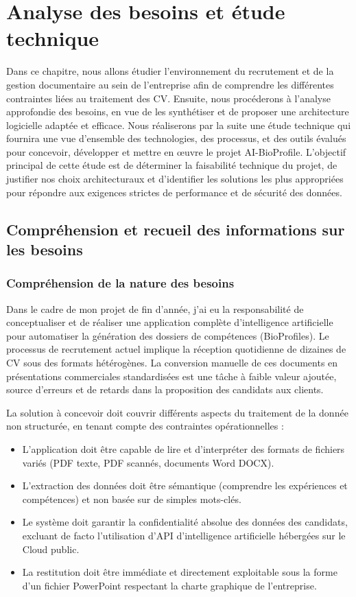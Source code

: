 
\chapter{Analyse des besoins et étude technique}

Dans ce chapitre, nous allons étudier l'environnement du recrutement et de la gestion documentaire au sein de l'entreprise afin de comprendre les différentes contraintes liées au traitement des CV. Ensuite, nous procéderons à l'analyse approfondie des besoins, en vue de les synthétiser et de proposer une architecture logicielle adaptée et efficace. Nous réaliserons par la suite une étude technique qui fournira une vue d'ensemble des technologies, des processus, et des outils évalués pour concevoir, développer et mettre en œuvre le projet AI-BioProfile. L'objectif principal de cette étude est de déterminer la faisabilité technique du projet, de justifier nos choix architecturaux et d'identifier les solutions les plus appropriées pour répondre aux exigences strictes de performance et de sécurité des données.

\section{Compréhension et recueil des informations sur les besoins}

\subsection{Compréhension de la nature des besoins}
Dans le cadre de mon projet de fin d'année, j'ai eu la responsabilité de conceptualiser et de réaliser une application complète d'intelligence artificielle pour automatiser la génération des dossiers de compétences (BioProfiles). Le processus de recrutement actuel implique la réception quotidienne de dizaines de CV sous des formats hétérogènes. La conversion manuelle de ces documents en présentations commerciales standardisées est une tâche à faible valeur ajoutée, source d'erreurs et de retards dans la proposition des candidats aux clients.

La solution à concevoir doit couvrir différents aspects du traitement de la donnée non structurée, en tenant compte des contraintes opérationnelles :
\begin{itemize}
    \item L'application doit être capable de lire et d'interpréter des formats de fichiers variés (PDF texte, PDF scannés, documents Word DOCX).
    \item L'extraction des données doit être sémantique (comprendre les expériences et compétences) et non basée sur de simples mots-clés.
    \item Le système doit garantir la confidentialité absolue des données des candidats, excluant de facto l'utilisation d'API d'intelligence artificielle hébergées sur le Cloud public.
    \item La restitution doit être immédiate et directement exploitable sous la forme d'un fichier PowerPoint respectant la charte graphique de l'entreprise.
\end{itemize}

